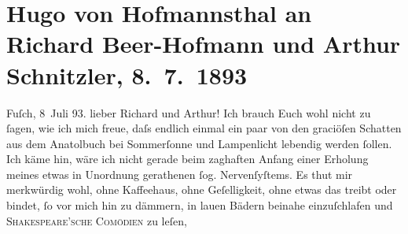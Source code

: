 

         
         \renewcommand{\erwaehntePersonen}{Personen: Richard Beer-Hofmann, Johann Wolfgang von Goethe, Hugo von Hofmannsthal, Friedrich Maximilian von Klinger, Friedrich von Schiller, William Shakespeare}
         \renewcommand{\erwaehnteInstitutionen}{Institutionen: Manz’sche Verlags- und Universitätsbuchhandlung}
         \renewcommand{\erwaehnteOrte}{Orte: Bad Fusch, Bad Ischl, Karlsbad, Kohlmarkt}
         \renewcommand{\erwaehnteWerke}{Werke: Anatol, Briefwechsel zwischen Schiller und Goethe, Gestern. Dramatische Studie in einem Akt in Versen}
               \section[Hugo von Hofmannsthal an Richard Beer-Hofmann und Arthur Schnitzler, 8. 7. 1893]{ Hugo von Hofmannsthal an Richard Beer-Hofmann und Arthur Schnitzler,
               8. 7. 1893}\nopagebreak{}\rehead{ }\begin{ledgroupsized}[t]{13cm}\normalsize\beginnumbering \toendnotes[C]{\smallbreak\pagebreak[2]} 
\pstart
           \raggedleft{}{\pb}Fuſch, 8 Juli 93.\pend
           \pstart{}lieber Richard und Arthur!\pend\pstart
           Ich brauch Euch wohl nicht zu ſagen, wie ich mich freue, daſs endlich einmal ein paar
               von den graciöſen Schatten aus dem Anatolbuch
               bei Sommerſonne und Lampenlicht lebendig werden ſollen. Ich käme hin, wäre ich nicht
               gerade beim zaghaften Anfang einer Erholung meines etwas in Unordnung gerathenen ſog.
               Nervenſyſtems.\pend
           \pstart
           Es thut mir merkwürdig wohl, ohne Kaffeehaus, ohne Geſelligkeit, ohne etwas das
               treibt oder bindet, ſo vor mich hin zu dämmern, {\pb}in
               lauen Bädern beinahe einzuſchlafen und \textsc{Shakespeare’sche Comödien} zu leſen,

\end{ledgroupsized}
